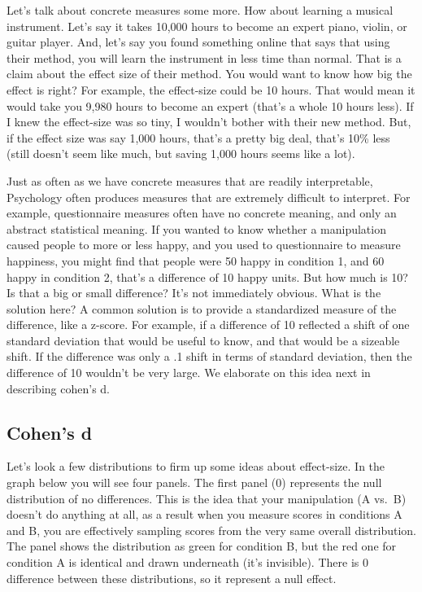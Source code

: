 \documentclass[
]{book}
\begin{document}
Let's talk about concrete measures some more. How about learning a musical instrument. Let's say it takes 10,000 hours to become an expert piano, violin, or guitar player. And, let's say you found something online that says that using their method, you will learn the instrument in less time than normal. That is a claim about the effect size of their method. You would want to know how big the effect is right? For example, the effect-size could be 10 hours. That would mean it would take you 9,980 hours to become an expert (that's a whole 10 hours less). If I knew the effect-size was so tiny, I wouldn't bother with their new method. But, if the effect size was say 1,000 hours, that's a pretty big deal, that's 10\% less (still doesn't seem like much, but saving 1,000 hours seems like a lot).

Just as often as we have concrete measures that are readily interpretable, Psychology often produces measures that are extremely difficult to interpret. For example, questionnaire measures often have no concrete meaning, and only an abstract statistical meaning. If you wanted to know whether a manipulation caused people to more or less happy, and you used to questionnaire to measure happiness, you might find that people were 50 happy in condition 1, and 60 happy in condition 2, that's a difference of 10 happy units. But how much is 10? Is that a big or small difference? It's not immediately obvious. What is the solution here? A common solution is to provide a standardized measure of the difference, like a z-score. For example, if a difference of 10 reflected a shift of one standard deviation that would be useful to know, and that would be a sizeable shift. If the difference was only a .1 shift in terms of standard deviation, then the difference of 10 wouldn't be very large. We elaborate on this idea next in describing cohen's d.

\subsection{Cohen's d}\label{cohens-d}

Let's look a few distributions to firm up some ideas about effect-size. In the graph below you will see four panels. The first panel (0) represents the null distribution of no differences. This is the idea that your manipulation (A vs.~B) doesn't do anything at all, as a result when you measure scores in conditions A and B, you are effectively sampling scores from the very same overall distribution. The panel shows the distribution as green for condition B, but the red one for condition A is identical and drawn underneath (it's invisible). There is 0 difference between these distributions, so it represent a null effect.
\end{document}
